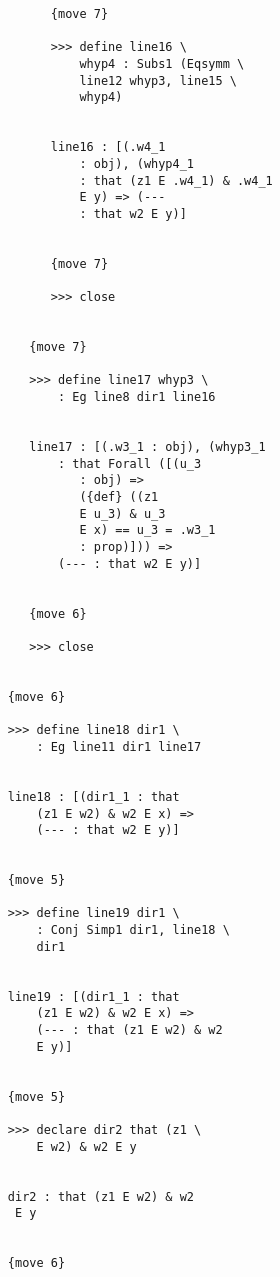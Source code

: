 \documentclass[12pt]{article}
\begin{document}
\begin{verbatim}
                        {move 7}

                        >>> define line16 \
                            whyp4 : Subs1 (Eqsymm \
                            line12 whyp3, line15 \
                            whyp4)


                        line16 : [(.w4_1 
                            : obj), (whyp4_1 
                            : that (z1 E .w4_1) & .w4_1 
                            E y) => (--- 
                            : that w2 E y)]


                        {move 7}

                        >>> close


                     {move 7}

                     >>> define line17 whyp3 \
                         : Eg line8 dir1 line16


                     line17 : [(.w3_1 : obj), (whyp3_1 
                         : that Forall ([(u_3 
                            : obj) => 
                            ({def} ((z1 
                            E u_3) & u_3 
                            E x) == u_3 = .w3_1 
                            : prop)])) => 
                         (--- : that w2 E y)]


                     {move 6}

                     >>> close


                  {move 6}

                  >>> define line18 dir1 \
                      : Eg line11 dir1 line17


                  line18 : [(dir1_1 : that 
                      (z1 E w2) & w2 E x) => 
                      (--- : that w2 E y)]


                  {move 5}

                  >>> define line19 dir1 \
                      : Conj Simp1 dir1, line18 \
                      dir1


                  line19 : [(dir1_1 : that 
                      (z1 E w2) & w2 E x) => 
                      (--- : that (z1 E w2) & w2 
                      E y)]


                  {move 5}

                  >>> declare dir2 that (z1 \
                      E w2) & w2 E y


                  dir2 : that (z1 E w2) & w2 
                   E y


                  {move 6}


\end{verbatim}
\end{document}
